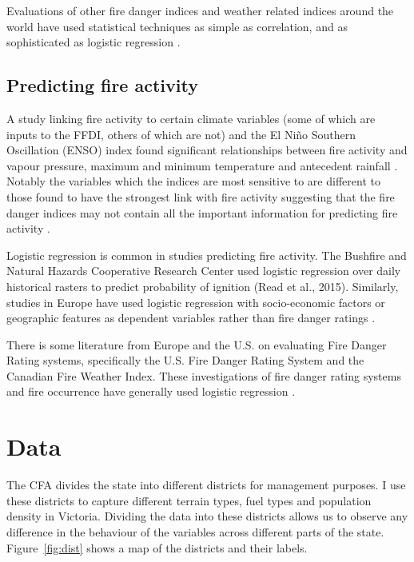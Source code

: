 \documentclass[11pt,a4paper]{article}
\begin{document}
Evaluations of other fire danger indices and weather related indices around the world have used statistical techniques as simple as correlation, and as sophisticated as logistic regression \citep{andrews03,harris14}.


\subsection{Predicting fire activity}

A study linking fire activity to certain climate variables (some of which are inputs to the FFDI, others of which are not) and the El Niño Southern Oscillation (ENSO) index found significant relationships between fire activity and vapour pressure, maximum and minimum temperature and antecedent rainfall \citep{harris14}. Notably the variables which the indices are most sensitive to are different to those found to have the strongest link with fire activity suggesting that the fire danger indices may not contain all the important information for predicting fire activity \citep{harris14}.

Logistic regression is common in studies predicting fire activity. The Bushfire and Natural Hazards Cooperative Research Center used logistic regression over daily historical rasters to predict probability of ignition (Read et al., 2015). Similarly, studies in Europe have used logistic regression with socio-economic factors or geographic features as dependent variables rather than fire danger ratings \citep{del11, zhang13}.

There is some literature from Europe and the U.S. on evaluating Fire Danger Rating systems, specifically the U.S. Fire Danger Rating System and the Canadian Fire Weather Index.  These investigations of fire danger rating systems and fire occurrence have  generally used logistic regression \citep{andrews03, padilla11}.

\section{Data}

The CFA divides the state into different districts for management purposes. I use these districts to capture different terrain types, fuel types and population density in Victoria. Dividing the data into these districts allows us to observe any difference in the behaviour of the variables across different parts of the state. Figure~\ref{fig:dist} shows a map of the districts and their labels.
\end{document}
